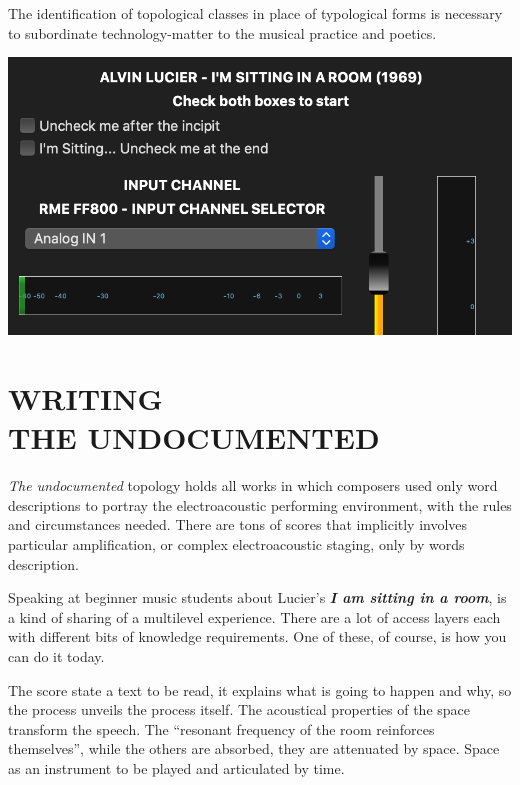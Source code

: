 \documentclass[
	a0,
	portrait
	]{a0poster}
\begin{document}
The identification of topological classes in place of typological forms is necessary to subordinate technology-matter to the musical practice and poetics.

\normalsize


\begin{multicols}{4}

\begin{center}
\includegraphics[width=1.\linewidth]{lais-GUI}
\end{center}


\section*{\color{cbordeaux}WRITING \\THE UNDOCUMENTED}

\emph{The undocumented} topology holds all works in which composers used only word descriptions to portray the electroacoustic performing environment, with the rules and circumstances needed. There are tons of scores that implicitly involves particular amplification, or complex electroacoustic staging, only by words description. 


Speaking at beginner music students about Lucier's \emph{\textbf{I am sitting in a room}}, is a kind of sharing of a multilevel experience. There are a lot of access layers each with different bits of knowledge requirements. One of these, of course, is how you can do it today. 

The score state a text to be read, it explains what is going to happen and why, so the process unveils the process itself. The acoustical properties of the space transform the speech. The “resonant frequency of the room reinforces themselves”, while the others are absorbed, they are attenuated by space. Space as an instrument to be played and articulated by time. 


\end{multicols}
\end{document}
